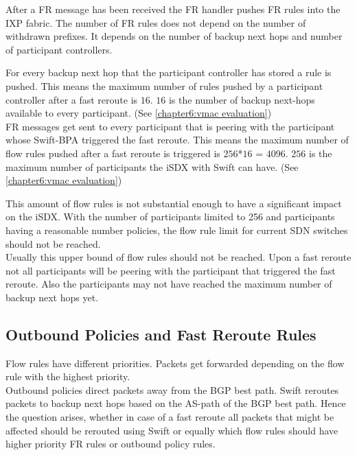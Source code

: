 After a FR message has been received the FR handler pushes FR rules into the IXP fabric. The number of FR rules does not depend on the number of withdrawn prefixes. It depends on the number of backup next hops and number of participant controllers. 

For every backup next hop that the participant controller has stored a rule is pushed. This means the maximum number of rules pushed by a participant controller after a fast reroute is $16$. $16$ is the number of backup next-hops available to every participant. (See \ref{chapter6:vmac evaluation}) \\
FR messages get sent to every participant that is peering with the participant whose Swift-BPA triggered the fast reroute. This means the maximum number of flow rules pushed after a fast reroute is triggered is $256$*$16$ = $4096$. $256$ is the maximum number of participants the iSDX with Swift can have. (See \ref{chapter6:vmac evaluation}) 

This amount of flow rules is not substantial enough to have a significant impact on the iSDX. With the number of participants limited to 256 and participants having a reasonable number policies, the flow rule limit for current SDN switches should not be reached. \cite[Figure 3 (a)]{gupta2016industrial}\\
Usually this upper bound of flow rules should not be reached. Upon a fast reroute not all participants will be peering with the participant that triggered the fast reroute. Also the participants may not have reached the maximum number of backup next hops yet.

\subsection{\label{chapter6:number of flow rules:outbound_FR}Outbound Policies and Fast Reroute Rules}

Flow rules have different priorities. Packets get forwarded depending on the flow rule with the highest priority. \\
Outbound policies direct packets away from the BGP best path. Swift reroutes packets to backup next hops based on the AS-path of the BGP best path. Hence the question arises, whether in case of a fast reroute all packets that might be affected should be rerouted using Swift or equally which flow rules should have higher priority FR rules or outbound policy rules.

